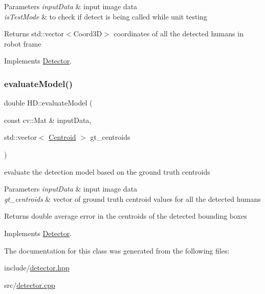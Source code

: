 \begin{DoxyParams}{Parameters}
{\em input\+Data} & input image data \\
\hline
{\em is\+Test\+Mode} & to check if detect is being called while unit testing \\
\hline
\end{DoxyParams}
\begin{DoxyReturn}{Returns}
std\+::vector$<$\+Coord3\+D$>$ coordinates of all the detected humans in robot frame 
\end{DoxyReturn}


Implements \hyperlink{classDetector_afdf99890fb93a11252eef0dd85598c15}{Detector}.

\mbox{\label{classHumanDetector_af24d889a9b48029f405a0e6c105b898a}} 
\subsubsection{\texorpdfstring{evaluate\+Model()}{evaluateModel()}}
{\footnotesize\ttfamily double H\+D\+::evaluate\+Model (\begin{DoxyParamCaption}\item[{const cv\+::\+Mat \&}]{input\+Data,  }\item[{std\+::vector$<$ \hyperlink{structCentroid}{Centroid} $>$}]{gt\+\_\+centroids }\end{DoxyParamCaption})\hspace{0.3cm}{\ttfamily [virtual]}}



evaluate the detection model based on the ground truth centroids 


\begin{DoxyParams}{Parameters}
{\em input\+Data} & input image data \\
\hline
{\em gt\+\_\+centroids} & vector of ground truth centroid values for all the detected humans \\
\hline
\end{DoxyParams}
\begin{DoxyReturn}{Returns}
double average error in the centroids of the detected bounding boxes 
\end{DoxyReturn}


Implements \hyperlink{classDetector}{Detector}.



The documentation for this class was generated from the following files\+:\begin{DoxyCompactItemize}
\item 
include/\hyperlink{detector_8hpp}{detector.\+hpp}\item 
src/\hyperlink{detector_8cpp}{detector.\+cpp}\end{DoxyCompactItemize}
